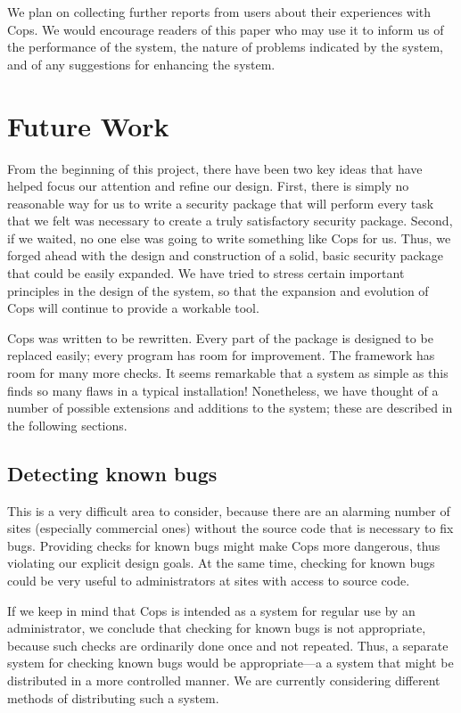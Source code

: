 We plan on collecting further reports from users about their experiences
with {\sc Cops}.  We would encourage readers of this paper who may use it to
inform us of the performance of the system, the nature of problems indicated
by the system, and of any suggestions for enhancing the system.

\section{Future Work}

From the beginning of this project, there have been two key ideas that have
helped focus our attention and refine our design.  First, there is simply no
reasonable way for us to write a security package that will perform every
task that we felt was necessary to create a truly satisfactory security
package.  Second, if we waited, no one else was going to write something
like {\sc Cops}  for us.
Thus, we forged ahead with the design and construction of a solid, basic
security package that could be easily expanded.  We have tried to stress
certain important  principles in the design of the system, so that the
expansion and evolution of {\sc Cops} will continue to provide a workable tool.

{\sc Cops} was written to be rewritten.  Every part of the package is designed
to be replaced easily; every program has room for improvement.  The
framework has room for many more checks.  It seems
remarkable that a system as simple as this finds so many flaws
in a typical  installation!  Nonetheless, we have thought of a number of
possible extensions and additions to the  system; these are described
in the following sections.

\subsection{Detecting known bugs}

This is a very difficult area to consider, because there are an
alarming number of sites (especially commercial ones) without the source
code that is necessary to fix bugs. 
Providing checks for known bugs might make {\sc Cops}  more dangerous, thus
violating our explicit design goals.  At the same time, checking for known
bugs could be very useful to administrators at sites with access to source code.

If we keep in mind that {\sc Cops} is intended as a system for regular
use by an administrator, we conclude that checking for known bugs is
not appropriate, because such checks are ordinarily done once and not
repeated.  Thus, a separate system for checking known bugs would be
appropriate---a a system that might be distributed in a more
controlled manner.  We are currently considering different methods of
distributing such a system.

